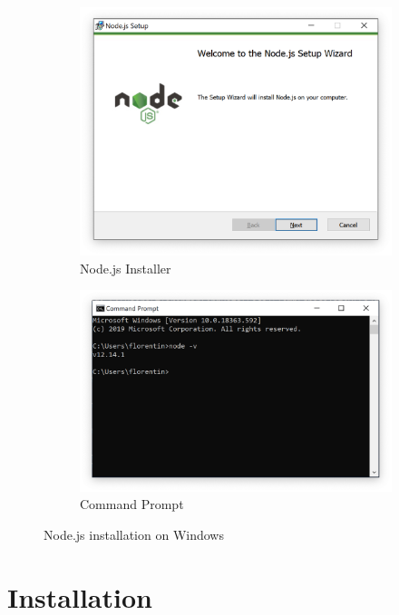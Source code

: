 \documentclass{article}
\begin{document}
\begin{figure}[h!]
	\centering
	\begin{subfigure}[b]{0.45\linewidth}
		\includegraphics[width=\linewidth]{assets/node-installer-windows.png}
		\caption{Node.js Installer}
	\end{subfigure}
	\begin{subfigure}[b]{0.45\linewidth}
		\includegraphics[width=\linewidth]{assets/node-cmd-windows.png}
		\caption{Command Prompt}
	\end{subfigure}
	\caption{Node.js installation on Windows}
	\label{fig:node-windows}
\end{figure}  

\section{Installation}
\end{document}
